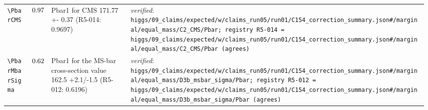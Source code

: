 {\begin{longtable}{@{}>{\raggedright\arraybackslash}p{}>{\raggedright\arraybackslash}p{}>{\raggedright\arraybackslash}p{}>{\raggedright\arraybackslash}p{}@{}}
\texttt{\textbackslash PbarCMS} & $0.97$ & Pbar1 for CMS 171.77 +- 0.37 (R5-014: 0.9697) & \emph{verified}: \texttt{higgs/\allowbreak{}09\_\allowbreak{}claims/\allowbreak{}expected/\allowbreak{}w/\allowbreak{}claims\_\allowbreak{}run05/\allowbreak{}run01/\allowbreak{}C154\_\allowbreak{}correction\_\allowbreak{}summary.json\#/\allowbreak{}marginal/\allowbreak{}equal\_\allowbreak{}mass/\allowbreak{}C2\_\allowbreak{}CMS/\allowbreak{}Pbar; registry R5-014 = higgs/\allowbreak{}09\_\allowbreak{}claims/\allowbreak{}expected/\allowbreak{}w/\allowbreak{}claims\_\allowbreak{}run05/\allowbreak{}run01/\allowbreak{}C154\_\allowbreak{}correction\_\allowbreak{}summary.json\#/\allowbreak{}marginal/\allowbreak{}equal\_\allowbreak{}mass/\allowbreak{}C2\_\allowbreak{}CMS/\allowbreak{}Pbar (agrees)} \\
\texttt{\textbackslash PbarMbarSigma} & $0.62$ & Pbar1 for the MS-bar cross-section value 162.5 +2.1/\allowbreak{}-1.5 (R5-012: 0.6196) & \emph{verified}: \texttt{higgs/\allowbreak{}09\_\allowbreak{}claims/\allowbreak{}expected/\allowbreak{}w/\allowbreak{}claims\_\allowbreak{}run05/\allowbreak{}run01/\allowbreak{}C154\_\allowbreak{}correction\_\allowbreak{}summary.json\#/\allowbreak{}marginal/\allowbreak{}equal\_\allowbreak{}mass/\allowbreak{}D3b\_\allowbreak{}msbar\_\allowbreak{}sigma/\allowbreak{}Pbar; registry R5-012 = higgs/\allowbreak{}09\_\allowbreak{}claims/\allowbreak{}expected/\allowbreak{}w/\allowbreak{}claims\_\allowbreak{}run05/\allowbreak{}run01/\allowbreak{}C154\_\allowbreak{}correction\_\allowbreak{}summary.json\#/\allowbreak{}marginal/\allowbreak{}equal\_\allowbreak{}mass/\allowbreak{}D3b\_\allowbreak{}msbar\_\allowbreak{}sigma/\allowbreak{}Pbar (agrees)} \\

\end{longtable}}
